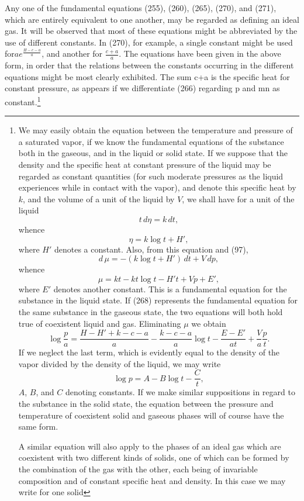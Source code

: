 \documentclass[12pt]{article}
\begin{document}
Any one of the fundamental equations (255), (260), (265), (270), and (271), which are entirely equivalent to one another, may be regarded as defining an ideal gas. It will be observed that most of these equations might be abbreviated by the use of different constants. In (270), for example, a single constant might be used for$a e^{\frac{H-c-a}{a}}$, and another for $\frac{c+a}{a}$. The equations have been given in the above form, in order that the relations between the constants occurring in the different equations might be most clearly exhibited. The sum c+a is the specific heat for constant pressure, as appears if we differentiate (266) regarding p and mn as constant.\footnote{We may easily obtain the equation between the temperature and pressure of a saturated vapor, if we know the fundamental equations of the substance both in the gaseous, and in the liquid or solid state. If we suppose that the density and the specific heat at constant pressure of the liquid may be regarded as constant quantities (for such moderate pressures as the liquid experiences while in contact with the vapor), and denote this specific heat by $k$, and the volume of a unit of the liquid by $V$, we shall have for a unit of the liquid
$$t \,d\eta=k\,dt,$$
whence%
$$\eta= k \log t + H',$$%
where $H'$ denotes a constant. Also, from this equation and (97),
$$ d\, \mu = -(k \log t + H')\,dt+ V\,dp,$$
whence %
$$\mu= kt- kt \log t - H't + Vp + E', $$%
where $E'$ denotes another constant. This is a fundamental equation for the substance in the liquid state. If (268) represents the fundamental equation for the same substance in the gaseous state, the two equations will both hold true of coexistent liquid and gas. Eliminating $\mu$ we obtain
$$ \log \frac{p}{a}=\frac{H-H'+k -c-a}{a} -\frac{k-c-a}{a}\log t - \frac{E - E'}{at} + \frac{V}{a} \frac{p}{t}. $$
If we neglect the last term, which is evidently equal to the density of the vapor divided by the density of the liquid, we may write
$$\log p= A - B \log t- \frac{C}{t},$$
$A$, $B$, and $C$ denoting constants. If we make similar suppositions in regard to the substance in the solid state, the equation between the pressure and temperature of coexistent solid and gaseous phases will of course have the same form.
\par A similar equation will also apply to the phases of an ideal gas which are coexistent with two different kinds of solids, one of which can be formed by the combination of the gas with the other, each being of invariable composition and of constant specific heat and density. In this case we may write for one solid
}
\end{document}
